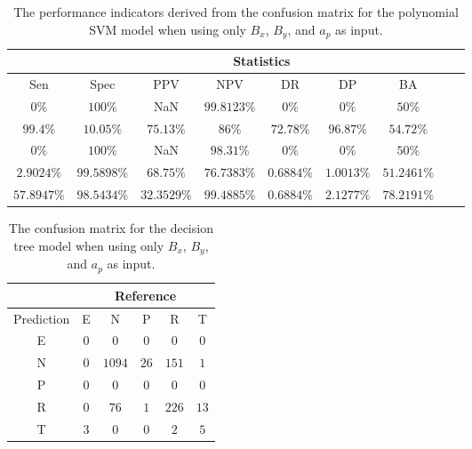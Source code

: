 \begin{table}[!ht]
	\centering
	\begin{tabular}{|c|c|c|c|c|c|c|c|c|}
		\hline
		 & \multicolumn{7}{c|}{Statistics} \\ \hline
		Sen & Spec & PPV & NPV & DR & DP & BA \\ \hline
		$0\%$ & $100\%$ & NaN & $99.8123\%$ & $0\%$ & $0\%$ & $50\%$ \\ \hline
		$99.4\%$ & $10.05\%$ & $75.13\%$ & $86\%$ & $72.78\%$ & $96.87\%$ & $54.72\%$ \\ \hline
		$0\%$ & $100\%$ & NaN & $98.31\%$ & $0\%$ & $0\%$ & $50\%$ \\ \hline
		$2.9024\%$ & $99.5898\%$ & $68.75\%$ & $76.7383\%$ & $0.6884\%$ & $1.0013\%$ & $51.2461\%$ \\ \hline
		$57.8947\%$ & $98.5434\%$ & $32.3529\%$ & $99.4885\%$ & $0.6884\%$ & $2.1277\%$ & $78.2191\%$ \\ \hline
	\end{tabular}
	\caption{The performance indicators derived from the confusion matrix for the polynomial SVM model when using only $B_{x}$, $B_{y}$, and $a_{p}$ as input.}
	\label{tab:cs:xyap:svmPoly}
\end{table}

\begin{table}[!ht]
	\centering
	\begin{tabular}{|c|c|c|c|c|c|}
		\hline
		 & \multicolumn{5}{|c|}{Reference} \\ \hline
		 Prediction & E & N & P & R & T \\ \hline
		 E & $0$ & $0$ & $0$ & $0$ & $0$ \\ \hline
		 N & $0$ & $1094$ & $26$ & $151$ & $1$ \\ \hline
		 P & $0$ & $0$ & $0$ & $0$ & $0$ \\ \hline
		 R & $0$ & $76$ & $1$ & $226$ & $13$ \\ \hline
		 T & $3$ & $0$ & $0$ & $2$ & $5$ \\ \hline
	\end{tabular}
	\caption{The confusion matrix for the decision tree model when using only $B_{x}$, $B_{y}$, and $a_{p}$ as input.}
	\label{tab:cm:xyap:C5.0}
\end{table}

